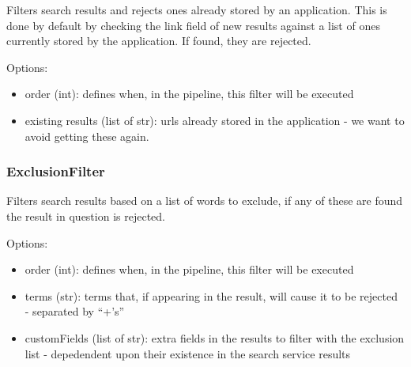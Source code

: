 \documentclass[letterpaper,10pt,english]{sphinxmanual}
\begin{document}
\begin{fulllineitems}
\label{api2.0:puppy.result.filter.DuplicateFilter}
Filters search results and rejects ones already stored by an application. This is done by default by checking the link field
of new results against a list of ones currently stored by the application. If found, they are rejected.

Options:
\begin{itemize}
\item {} 
order (int): defines when, in the pipeline, this filter will be executed

\item {} 
existing results (list of str): urls already stored in the application - we want to avoid getting these again.

\end{itemize}

\end{fulllineitems}



\subsubsection{ExclusionFilter}
\label{api2.0:exclusionfilter}

\begin{fulllineitems}
\label{api2.0:puppy.result.filter.ExclusionFilter}
Filters search results based on a list of words to exclude, if any of these are found the
result in question is rejected.

Options:
\begin{itemize}
\item {} 
order (int): defines when, in the pipeline, this filter will be executed

\item {} 
terms (str): terms that, if appearing in the result, will cause it to be rejected - separated by ``+'s''

\item {} 
customFields (list of str): extra fields in the results to filter with the exclusion list - depedendent upon their existence in the search service results

\end{itemize}

\end{fulllineitems}
\end{document}
